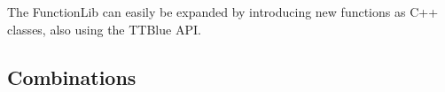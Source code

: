 \documentclass{article}
\begin{document}
The FunctionLib can easily be expanded by introducing new functions as C++ classes, also using the TTBlue API.








\subsection{Combinations} %
\label{sec:combinations}
\end{document}
